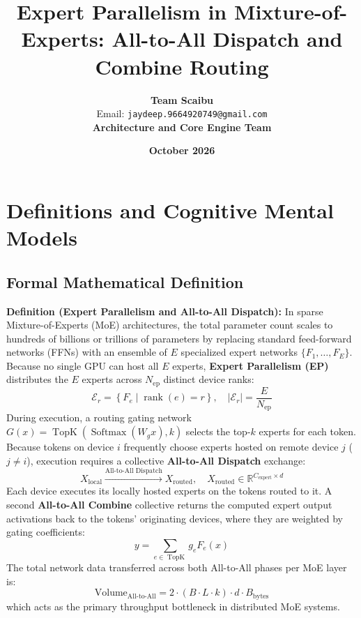 \documentclass[11pt,a4paper]{article}
\title{\textbf{Expert Parallelism in Mixture-of-Experts: All-to-All Dispatch and Combine Routing}}
\author{\textbf{Team Scaibu} \\ \small Email: \texttt{jaydeep.9664920749@gmail.com} \\ \small \textbf{Architecture and Core Engine Team}}
\date{\textbf{October 2026}}
\theoremstyle{definition}
\begin{document}
\maketitle

\section{Definitions and Cognitive Mental Models}

\subsection{Formal Mathematical Definition}
\textbf{Definition (Expert Parallelism and All-to-All Dispatch):}
In sparse Mixture-of-Experts (MoE) architectures, the total parameter count scales to hundreds of billions or trillions of parameters by replacing standard feed-forward networks (FFNs) with an ensemble of $E$ specialized expert networks $\{F_1, \dots, F_E\}$. Because no single GPU can host all $E$ experts, \textbf{Expert Parallelism (EP)} distributes the $E$ experts across $N_{\text{ep}}$ distinct device ranks:
{\boldmath
\begin{equation}
\mathcal{E}_r = \left\{ F_e \mid \operatorname{rank}(e) = r \right\}, \quad |\mathcal{E}_r| = \frac{E}{N_{\text{ep}}}
\end{equation}
}
During execution, a routing gating network $G(x) = \operatorname{TopK}(\operatorname{Softmax}(W_g x), k)$ selects the top-$k$ experts for each token. Because tokens on device $i$ frequently choose experts hosted on remote device $j$ ($j \neq i$), execution requires a collective \textbf{All-to-All Dispatch} exchange:
{\boldmath
\begin{equation}
X_{\text{local}} \xrightarrow{\text{All-to-All Dispatch}} X_{\text{routed}}, \quad X_{\text{routed}} \in \mathbb{R}^{C_{\text{expert}} \times d}
\end{equation}
}
Each device executes its locally hosted experts on the tokens routed to it. A second \textbf{All-to-All Combine} collective returns the computed expert output activations back to the tokens' originating devices, where they are weighted by gating coefficients:
{\boldmath
\begin{equation}
y = \sum_{e \in \operatorname{TopK}} g_e F_e(x)
\end{equation}
}
The total network data transferred across both All-to-All phases per MoE layer is:
{\boldmath
\begin{equation}
\text{Volume}_{\text{All-to-All}} = 2 \cdot (B \cdot L \cdot k) \cdot d \cdot B_{\text{bytes}}
\end{equation}
}
which acts as the primary throughput bottleneck in distributed MoE systems.
\end{document}
